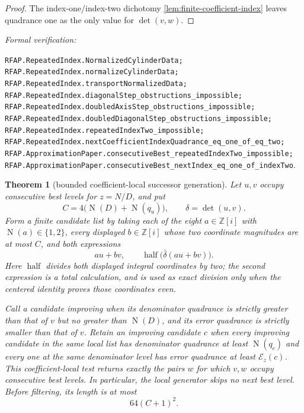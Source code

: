 \documentclass[11pt]{article}
\newtheorem{theorem}{Theorem}[section]
\newcommand{\Zi}{\mathbb{Z}[i]}
\newcommand{\Norm}[1]{\operatorname{N}\!\left(#1\right)}
\newcommand{\leanref}[1]{\par\smallskip\noindent
  \emph{Formal verification:}\par\nobreak
  {\raggedright\nolinkurl{#1}.\par}}
\begin{document}
\begin{proof}
The index-one/index-two dichotomy
\cref{lem:finite-coefficient-index} leaves quadrance one as the only value
for $\det(v,w)$.
\end{proof}

\leanref{RFAP.RepeatedIndex.NormalizedCylinderData;
RFAP.RepeatedIndex.normalizeCylinderData;
RFAP.RepeatedIndex.transportNormalizedData;
RFAP.RepeatedIndex.diagonalStep_obstructions_impossible;
RFAP.RepeatedIndex.doubledAxisStep_obstructions_impossible;
RFAP.RepeatedIndex.doubledDiagonalStep_obstructions_impossible;
RFAP.RepeatedIndex.repeatedIndexTwo_impossible;
RFAP.RepeatedIndex.nextCoefficientIndexQuadrance_eq_one_of_eq_two;
RFAP.ApproximationPaper.consecutiveBest_repeatedIndexTwo_impossible;
RFAP.ApproximationPaper.consecutiveBest_nextIndex_eq_one_of_indexTwo}

\begin{theorem}[bounded coefficient-local successor generation]
\label{thm:local-successor-generation}
Let $u,v$ occupy consecutive best levels for $z=N/D$, and put
\[
 C=4\bigl(\Norm D+\Norm{q_u}\bigr),
 \qquad \delta=\det(u,v).
\]
Form a finite candidate list by taking each of the eight
$a\in\Zi$ with $\Norm a\in\{1,2\}$, every displayed $b\in\Zi$ whose two
coordinate magnitudes are at most $C$, and both expressions
\begin{equation}
 au+bv,
 \qquad
 \operatorname{half}\bigl(\bar\delta(au+bv)\bigr).
 \label{eq:local-successor-forms}
\end{equation}
Here $\operatorname{half}$ divides both displayed integral coordinates by
two; the second expression is a total calculation, and is used as exact
division only when the centered identity proves those coordinates even.

Call a candidate \emph{improving} when its denominator quadrance is strictly
greater than that of $v$ but no greater than $\Norm D$, and its error
quadrance is strictly smaller than that of $v$.  Retain an improving candidate
$c$ when every improving candidate in the same local list has denominator
quadrance at least $\Norm{q_c}$ and every one at the same denominator level has
error quadrance at least $\mathcal E_z(c)$.  This coefficient-local test
returns exactly the pairs $w$ for which $v,w$ occupy consecutive best levels.
In particular, the local generator skips no next best level.  Before
filtering, its length is at most
\begin{equation}
                         64(C+1)^2.
 \label{eq:local-successor-count}
\end{equation}
\end{theorem}
\end{document}
